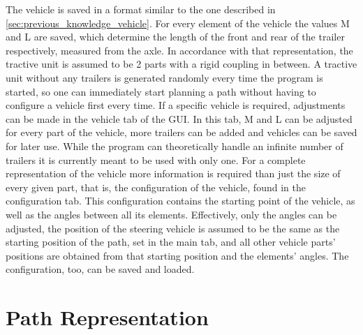 The vehicle is saved in a format similar to the one described in \ref{sec:previous_knowledge_vehicle}. For every element of the vehicle the values M and L are saved, which determine the length of the front and rear of the trailer respectively, measured from the axle. In accordance with that representation, the tractive unit is assumed to be 2 parts with a rigid coupling in between. A tractive unit without any trailers is generated randomly every time the program is started, so one can immediately start planning a path without having to configure a vehicle first every time. If a specific vehicle is required, adjustments can be made in the vehicle tab of the GUI. In this tab, M and L can be adjusted for every part of the vehicle, more trailers can be added and vehicles can be saved for later use. While the program can theoretically handle an infinite number of trailers it is currently meant to be used with only one.
For a complete representation of the vehicle more information is required than just the size of every given part, that is, the configuration of the vehicle, found in the configuration tab. This configuration contains the starting point of the vehicle, as well as the angles between all its elements. Effectively, only the angles can be adjusted, the position of the steering vehicle is assumed to be the same as the starting position of the path, set in the main tab, and all other vehicle parts' positions are obtained from that starting position and the elements' angles. The configuration, too, can be saved and loaded.

\section{Path Representation}
\label{sec:path_representation}

